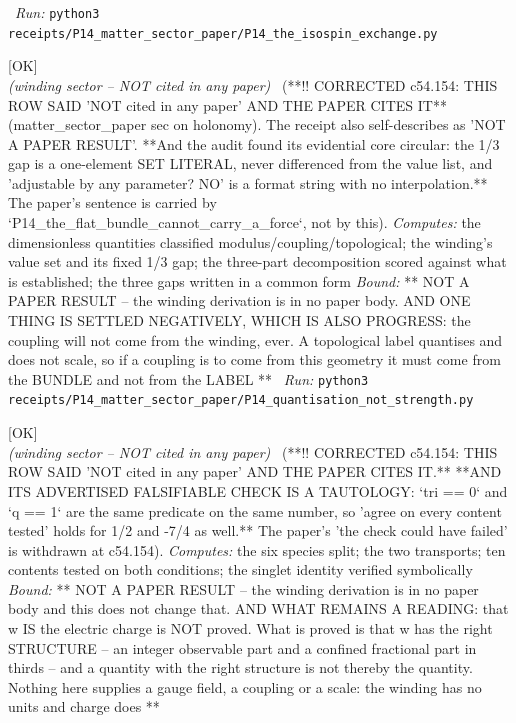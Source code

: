 \begin{description}
\ \emph{Run:} \texttt{python3 receipts/P14\_matter\_sector\_paper/P14\_the\_isospin\_exchange.py}
\item[\label{rcpt:P14_quantisation_not_strength}\texttt{P14\_quantisation\_not\_strength}]\hfill\textsf{[OK]}\\
\textit{(winding sector -- NOT cited in any paper)} \ (**!! CORRECTED c54.154: THIS ROW SAID 'NOT cited in any paper' AND THE PAPER CITES IT** (matter\_sector\_paper sec on holonomy). The receipt also self-describes as 'NOT A PAPER RESULT'. **And the audit found its evidential core circular: the 1/3 gap is a one-element SET LITERAL, never differenced from the value list, and 'adjustable by any parameter? NO' is a format string with no interpolation.** The paper's sentence is carried by `P14\_the\_flat\_bundle\_cannot\_carry\_a\_force`, not by this). 
\emph{Computes:} the dimensionless quantities classified modulus/coupling/topological; the winding's value set and its fixed 1/3 gap; the three-part decomposition scored against what is established; the three gaps written in a common form
 \emph{Bound:} ** NOT A PAPER RESULT -- the winding derivation is in no paper body. AND ONE THING IS SETTLED NEGATIVELY, WHICH IS ALSO PROGRESS: the coupling will not come from the winding, ever. A topological label quantises and does not scale, so if a coupling is to come from this geometry it must come from the BUNDLE and not from the LABEL **
\ \emph{Run:} \texttt{python3 receipts/P14\_matter\_sector\_paper/P14\_quantisation\_not\_strength.py}
\item[\label{rcpt:P14_charge_or_colour}\texttt{P14\_charge\_or\_colour}]\hfill\textsf{[OK]}\\
\textit{(winding sector -- NOT cited in any paper)} \ (**!! CORRECTED c54.154: THIS ROW SAID 'NOT cited in any paper' AND THE PAPER CITES IT.** **AND ITS ADVERTISED FALSIFIABLE CHECK IS A TAUTOLOGY: `tri == 0` and `q == 1` are the same predicate on the same number, so 'agree on every content tested' holds for 1/2 and -7/4 as well.** The paper's 'the check could have failed' is withdrawn at c54.154). 
\emph{Computes:} the six species split; the two transports; ten contents tested on both conditions; the singlet identity verified symbolically
 \emph{Bound:} ** NOT A PAPER RESULT -- the winding derivation is in no paper body and this does not change that. AND WHAT REMAINS A READING: that w IS the electric charge is NOT proved. What is proved is that w has the right STRUCTURE -- an integer observable part and a confined fractional part in thirds -- and a quantity with the right structure is not thereby the quantity. Nothing here supplies a gauge field, a coupling or a scale: the winding has no units and charge does **

\end{description}
